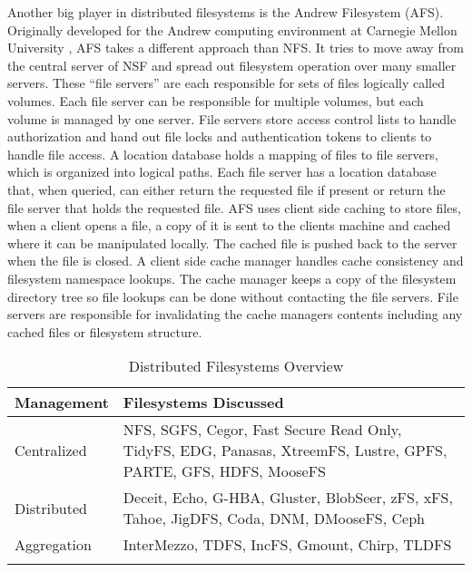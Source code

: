 Another big player in distributed filesystems is the Andrew Filesystem (AFS). Originally developed for the Andrew computing environment at Carnegie Mellon University \cite{Howard1988,Howard1988a,Howard1985}, AFS takes a different approach than NFS. It tries to move away from the central server of NSF and spread out filesystem operation over many smaller servers. These ``file servers'' are each responsible for sets of files logically called volumes. Each file server can be responsible for multiple volumes, but each volume is managed by one server. File servers store access control lists to handle authorization and hand out file locks and authentication tokens to clients to handle file access. A location database holds a mapping of files to file servers, which is organized into logical paths. Each file server has a location database that, when queried, can either return the requested file if present or return the file server that holds the requested file. AFS uses client side caching to store files, when a client opens a file, a copy of it is sent to the clients machine and cached where it can be manipulated locally. The cached file is pushed back to the server when the file is closed. A client side cache manager handles cache consistency and filesystem namespace lookups. The cache manager keeps a copy of the filesystem directory tree so file lookups can be done without contacting the file servers. File servers are responsible for invalidating the cache managers contents including any cached files or filesystem structure. 


\begin{table}
\centering
\begin{tabular}[h]{p{3cm}|p{8cm}}

\textbf{Management} & \textbf{Filesystems Discussed} \\
\hline
Centralized & NFS, SGFS, Cegor, Fast Secure Read Only, TidyFS, EDG, Panasas, XtreemFS, Lustre, GPFS, PARTE, GFS, HDFS, MooseFS \\
Distributed & Deceit, Echo, G-HBA, Gluster, BlobSeer, zFS, xFS, Tahoe, JigDFS, Coda, DNM, DMooseFS, Ceph \\
Aggregation & InterMezzo, TDFS, IncFS, Gmount, Chirp, TLDFS \\
\\

\end{tabular}
\caption{Distributed Filesystems Overview}
\label{tab:reloverview}
\end{table}



